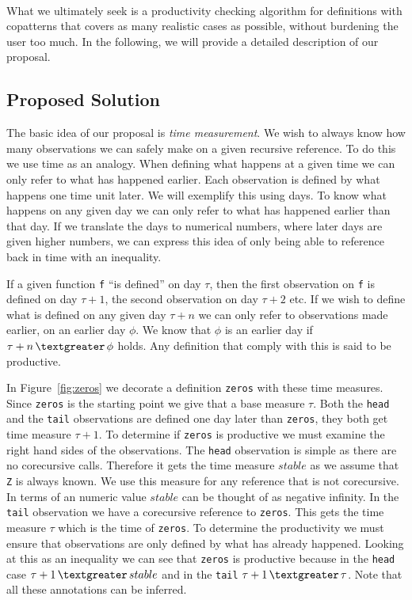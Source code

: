 \paragraph{}
What we ultimately seek is a productivity checking algorithm for definitions with copatterns that covers as many realistic cases as possible, without burdening the user too much. In the following, we will provide a detailed description of our proposal.
\subsection{Proposed Solution}
The basic idea of our proposal is \textit{time measurement}. We wish to always know how many observations we can safely make on a given recursive reference. To do this we use time as an analogy. When defining what happens at a given time we can only refer to what has happened earlier. Each observation is defined by what happens one time unit later. We will exemplify this using days. To know what happens on any given day we can only refer to what has happened earlier than that day. If we translate the days to numerical numbers, where later days are given higher numbers, we can express this idea of only being able to reference back in time with an inequality.

If a given function \texttt{f} ``is defined'' on day $\tau$, then the first observation on \texttt{f} is defined on day $\tau+1$, the second observation on day $\tau+2$ etc. If we wish to define what is defined on any given day $\tau+n$ we can only refer to observations made earlier, on an earlier day $\phi$. We know that $\phi$ is an earlier day if $\tau+n\, \textgreater \,\phi$ holds. Any definition that comply with this is said to be productive.

In Figure~\ref{fig:zeros} we decorate a definition \texttt{zeros} with these time measures. Since \texttt{zeros} is the starting point we give that a base measure $\tau$. Both the \texttt{head} and the \texttt{tail} observations are defined one day later than \texttt{zeros}, they both get time measure $\tau+1$. To determine if \texttt{zeros} is productive we must examine the right hand sides of the observations. The \texttt{head} observation is simple as there are no corecursive calls. Therefore it gets the time measure $stable$  as we assume that \texttt{Z} is always known. We use this measure for any reference that is not corecursive. In terms of an numeric value $stable$ can be thought of as negative infinity. In the \texttt{tail} observation we have a corecursive reference to \texttt{zeros}. This gets the time measure $\tau$ which is the time of \texttt{zeros}. To determine the productivity we must ensure that observations are only defined by what has already happened. Looking at this as an inequality we can see that \texttt{zeros} is productive because in the \texttt{head} case $\tau+1\,\textgreater\,stable$ and in the \texttt{tail} $\tau+1\,\textgreater\,\tau$. Note that all these annotations can be inferred.

